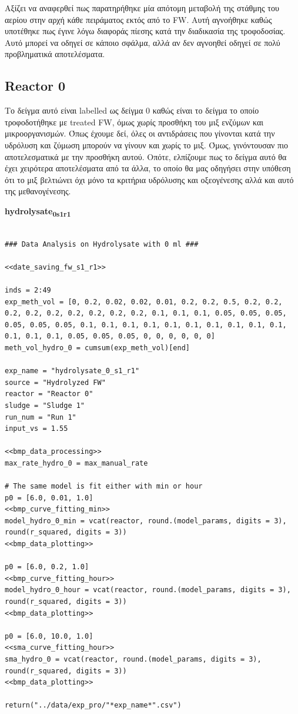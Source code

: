 \documentclass[11pt]{article}
\begin{document}
Αξίζει να αναφερθεί πως παρατηρήθηκε μία απότομη μεταβολή της στάθμης του αερίου στην αρχή κάθε πειράματος εκτός από το FW. Αυτή αγνοήθηκε καθώς υποτέθηκε πως έγινε λόγω διαφοράς πίεσης κατά την διαδικασία της τροφοδοσίας. Αυτό μπορεί να οδηγεί σε κάποιο σφάλμα, αλλά αν δεν αγνοηθεί οδηγεί σε πολύ προβληματικά αποτελέσματα.

\subsection{Reactor 0}
\label{sec:org768e345}
Το δείγμα αυτό είναι labelled ως δείγμα 0 καθώς είναι το δείγμα το οποίο τροφοδοτήθηκε με treated FW, όμως χωρίς προσθήκη του μιξ ενζύμων και μικροοργανισμών. Όπως έχουμε δεί, όλες οι αντιδράσεις που γίνονται κατά την υδρόλυση και ζύμωση μπορούν να γίνουν και χωρίς το μιξ. Όμως, γινόντουσαν πιο αποτελεσματικά με την προσθήκη αυτού. Οπότε, ελπίζουμε πως το δείγμα αυτό θα έχει χειρότερα αποτελέσματα από τα άλλα, το οποίο θα μας οδηγήσει στην υπόθεση ότι το μιξ βελτιώνει όχι μόνο τα κριτήρια υδρόλυσης και οξεογένεσης αλλά και αυτό της μεθανογένεσης.

\textbf{hydrolysate\textsubscript{0}\textsubscript{s1}\textsubscript{r1}}
\begin{verbatim}

### Data Analysis on Hydrolysate with 0 ml ###

<<date_saving_fw_s1_r1>>

inds = 2:49
exp_meth_vol = [0, 0.2, 0.02, 0.02, 0.01, 0.2, 0.2, 0.5, 0.2, 0.2, 0.2, 0.2, 0.2, 0.2, 0.2, 0.2, 0.2, 0.1, 0.1, 0.1, 0.05, 0.05, 0.05, 0.05, 0.05, 0.05, 0.1, 0.1, 0.1, 0.1, 0.1, 0.1, 0.1, 0.1, 0.1, 0.1, 0.1, 0.1, 0.1, 0.05, 0.05, 0.05, 0, 0, 0, 0, 0, 0]
meth_vol_hydro_0 = cumsum(exp_meth_vol)[end]

exp_name = "hydrolysate_0_s1_r1"
source = "Hydrolyzed FW"
reactor = "Reactor 0"
sludge = "Sludge 1"
run_num = "Run 1"
input_vs = 1.55

<<bmp_data_processing>>
max_rate_hydro_0 = max_manual_rate

# The same model is fit either with min or hour
p0 = [6.0, 0.01, 1.0]
<<bmp_curve_fitting_min>>
model_hydro_0_min = vcat(reactor, round.(model_params, digits = 3), round(r_squared, digits = 3))
<<bmp_data_plotting>>

p0 = [6.0, 0.2, 1.0]
<<bmp_curve_fitting_hour>>
model_hydro_0_hour = vcat(reactor, round.(model_params, digits = 3), round(r_squared, digits = 3))
<<bmp_data_plotting>>

p0 = [6.0, 10.0, 1.0]
<<sma_curve_fitting_hour>>
sma_hydro_0 = vcat(reactor, round.(model_params, digits = 3), round(r_squared, digits = 3))
<<bmp_data_plotting>>

return("../data/exp_pro/"*exp_name*".csv")
\end{verbatim}
\end{document}
